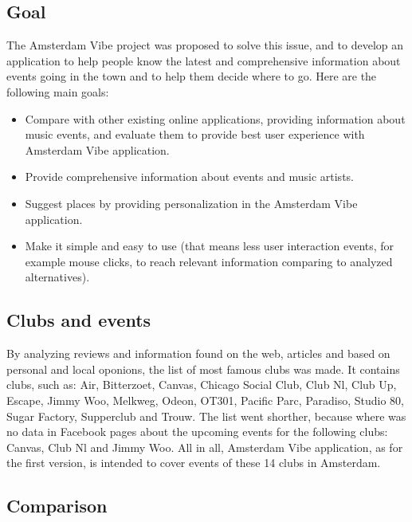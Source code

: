 \documentclass[12pt, a4paper, lithuanian]{article}
\begin{document}
\subsection{Goal}

  The Amsterdam Vibe project was proposed to solve this issue, and to develop an application to help people know the latest and comprehensive information about events going in the town and to help them decide where to go.
  Here are the following main goals:

\begin{itemize}

  \item Compare with other existing online applications, providing information about music events, and evaluate them to provide best user experience with Amsterdam Vibe application.

  \item Provide comprehensive information about events and music artists.

  \item Suggest places by providing personalization in the Amsterdam Vibe application.

  \item Make it simple and easy to use (that means less user interaction events, for example mouse clicks, to reach relevant information comparing to analyzed alternatives).

\end{itemize}

\subsection{Clubs and events}

  By analyzing reviews and information found on the web, articles and based on personal and local oponions, the list of most famous clubs was made. It contains clubs, such as: Air, Bitterzoet, Canvas, Chicago Social Club, Club Nl, Club Up, Escape, Jimmy Woo, Melkweg, Odeon, OT301, Pacific Parc, Paradiso, Studio 80, Sugar Factory, Supperclub and Trouw. The list went shorther, because where was no data in Facebook pages about the upcoming events for the following clubs: Canvas, Club Nl and Jimmy Woo. All in all, Amsterdam Vibe application, as for the first version, is intended to cover events of these 14 clubs in Amsterdam.

\subsection{Comparison}
\end{document}
